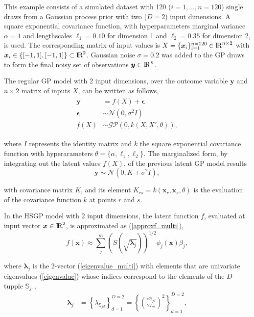 \documentclass[]{interact}
\theoremstyle{plain}%
\theoremstyle{definition}
\theoremstyle{remark}
\begin{document}
This example consists of a simulated dataset with 120 ($i=1,\dots,n=120$) single draws from a Gaussian process prior with two ($D=2$) input dimensions. A square exponential covariance function, with hyperparameters marginal variance $\alpha=1$ and lengthscales $\ell_1=0.10$ for dimension 1 and $\ell_2=0.35$ for dimension 2, is used. The corresponding matrix of input values is $X=\{\bm{x}_i\}_{i=1}^{n=120} \in {\rm I\!R}^{n\times 2}$ with $\bm{x}_i \in \{[-1,1],[-1,1]\} \subset {\rm I\!R}^2$. Gaussian noise $\sigma=0.2$ was added to the GP draws to form the final noisy set of observations $\bm{y} \in {\rm I\!R}^n$.

The regular GP model with 2 input dimensions, over the outcome variable $\bm{y}$ and $n \times 2$ matrix of inputs $X$, can be written as follows,
%
\begin{eqnarray*}\label{eq:latentgp_simudata2}
\begin{split}
\bm{y} &= f(X) + \bm{\epsilon} \\
\bm{\epsilon} &\sim \mathcal{N}(0, \sigma^2  I) \\
f(X) &\sim \mathcal{GP}(0, k(X, X', \theta)),
\end{split}
\end{eqnarray*}

\noindent where $I$ represents the identity matrix and $k$ the square exponential covariance function with hyperarameters $\theta=\{\alpha,\ell_1,\ell_2\}$. The marginalized form, by integrating out the latent values $f(X)$, of the previous latent GP model results 
%
\begin{equation*}\label{eq:marginalizedgp_simudata2}
\bm{y} \sim \mathcal{N}(0, K + \sigma^2 I ),
\end{equation*}

\noindent with covariance matrix $K$, and its element $K_{rs}=k(\bm{x}_r,\bm{x}_s,\theta)$ is the evaluation of the covariance function $k$ at points $r$ and $s$.

In the HSGP model with 2 input dimensions, the latent function $f$, evaluated at input vector $\bm{x} \in {\rm I\!R}^2$, is approximated as (\ref{approxf_multi}),
%
\begin{equation*}
f(\bm{x}) \approx \sum_{j}^m \left( S(\sqrt{\bm{\lambda}_j})\right)^{1/2} \phi_j(\bm{x}) \beta_j,
\end{equation*}

\noindent where $\bm{\lambda}_j$ is the 2-vector (\ref{eigenvalue_multi}) with elements that are univariate eigenvalues (\ref{eigenvalue}) whose indices correspond to the elements of the $D$-tupple $\mathbb{S}_{j\cdotp}$,
%
\begin{align*}
\bm{\lambda}_j &= \left\{ \lambda_{\mathbb{S}_{jd}} \right\}_{d=1}^{D=2} = \left\{ \left(\tfrac{\pi \mathbb{S}_{jd}}{2L_d}\right)^2 \right\}_{d=1}^{D=2},
\end{align*}
\end{document}
